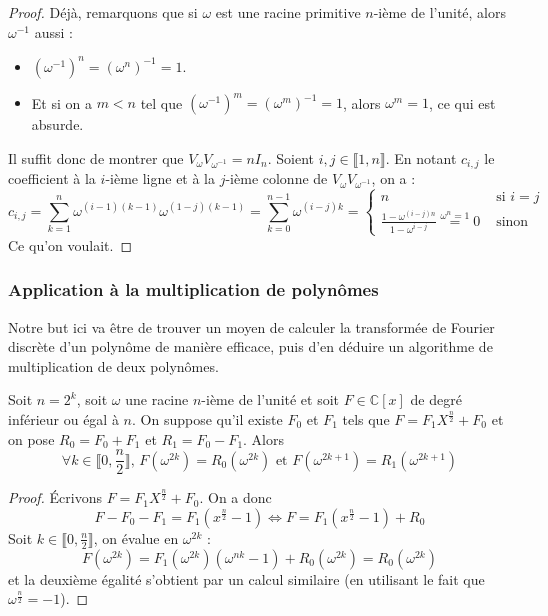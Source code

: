   \begin{proof}
    Déjà, remarquons que si $\omega$ est une racine primitive $n$-ième de l'unité, alors $\omega^{-1}$ aussi :
    \begin{itemize}
      \item $(\omega^{-1})^n = (\omega^n)^{-1} = 1$.
      \item Et si on a $m < n$ tel que $(\omega^{-1})^m = (\omega^m)^{-1} = 1$, alors $\omega^m = 1$, ce qui est absurde.
    \end{itemize}
    Il suffit donc de montrer que $V_\omega V_{\omega^{-1}} = n I_n$. Soient $i, j \in \llbracket 1, n \rrbracket$. En notant $c_{i,j}$ le coefficient à la $i$-ième ligne et à la $j$-ième colonne de $V_\omega V_{\omega^{-1}}$, on a :
    \[
    c_{i,j}
    = \sum_{k=1}^n \omega^{(i-1)(k-1)} \omega^{(1-j)(k-1)}
    = \sum_{k=0}^{n-1} \omega^{(i-j)k}
    = \begin{cases}
      n &\text{ si } i = j \\
      \frac{1 - \omega^{(i-j)n}}{1 - \omega^{i-j}} \overset{\omega^n = 1}{=} 0 &\text{ sinon}
    \end{cases}
    \]
    Ce qu'on voulait.
  \end{proof}

  \subsubsection{Application à la multiplication de polynômes}

  Notre but ici va être de trouver un moyen de calculer la transformée de Fourier discrète d'un polynôme de manière efficace, puis d'en déduire un algorithme de multiplication de deux polynômes.

  \begin{proposition}
    \label{transformee-de-fourier-discrete-4}
    Soit $n = 2^k$, soit $\omega$ une racine $n$-ième de l'unité et soit $F \in \mathbb{C}[x]$ de degré inférieur ou égal à $n$. On suppose qu'il existe $F_0$ et $F_1$ tels que $F = F_1 X^{\frac{n}{2}} + F_0$ et on pose $R_0 = F_0 + F_1$ et $R_1 = F_0 - F_1$. Alors
    \[ \forall k \in \llbracket 0, \frac{n}{2} \rrbracket, \, F(\omega^{2k}) = R_0(\omega^{2k}) \text{ et } F(\omega^{2k+1}) = R_1(\omega^{2k+1}) \]
  \end{proposition}

  \begin{proof}
    Écrivons $F = F_1 X^{\frac{n}{2}} + F_0$. On a donc
    \[ F - F_0 - F_1 = F_1(x^{\frac{n}{2}} - 1) \iff F = F_1(x^{\frac{n}{2}} - 1) + R_0 \]
    Soit $ k \in \llbracket 0, \frac{n}{2} \rrbracket$, on évalue en $\omega^{2k}$ :
    \[ F(\omega^{2k}) = F_1(\omega^{2k})(\omega^{nk} - 1) + R_0(\omega^{2k}) = R_0(\omega^{2k}) \]
    et la deuxième égalité s'obtient par un calcul similaire (en utilisant le fait que $\omega^{\frac{n}{2}} = -1$).
  \end{proof}


